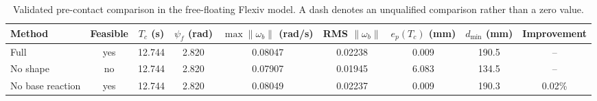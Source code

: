\begin{table}[t]
\centering
\caption{Validated pre-contact comparison in the free-floating Flexiv model. A dash denotes an unqualified comparison rather than a zero value.}
\label{tab:precontact_comparison}
\begin{tabular}{lcccccccc}
\toprule
Method & Feasible & $T_c$ (s) & $\psi_f$ (rad) & $\max\|\omega_b\|$ (rad/s) & RMS $\|\omega_b\|$ & $e_p(T_c)$ (mm) & $d_{\min}$ (mm) & Improvement \\
\midrule
Full & yes & 12.744 & 2.820 & 0.08047 & 0.02238 & 0.009 & 190.5 & -- \\
No shape & no & 12.744 & 2.820 & 0.07907 & 0.01945 & 6.083 & 134.5 & -- \\
No base reaction & yes & 12.744 & 2.820 & 0.08049 & 0.02237 & 0.009 & 190.3 & 0.02\% \\
\bottomrule
\end{tabular}
\end{table}
